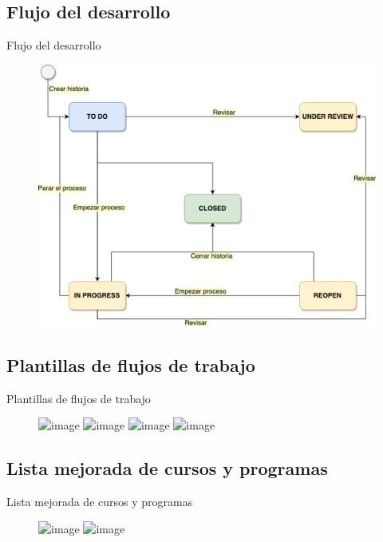 \documentclass[10pt,xcolor=table ]{beamer}
\begin{document}
\subsection{Flujo del desarrollo}
\begin{frame}{Flujo del desarrollo}
\begin{figure}
		\centering
	    \includegraphics[scale=0.35]{../Figuras/workflow_1}
	\end{figure}
\end{frame}

\subsection{Plantillas de flujos de trabajo}
\begin{frame}{Plantillas de flujos de trabajo}
	\begin{figure}
		\centering
		\includegraphics<1>[scale=0.4]{../Figuras/Pantallas/template_1}
		\includegraphics<2>[scale=0.3]{../Figuras/Pantallas/template_2}
		\includegraphics<3>[scale=0.3]{../Figuras/Pantallas/template_3}
		\includegraphics<4>[scale=0.3]{../Figuras/Pantallas/template_4}
	\end{figure}
\end{frame}

\subsection{Lista mejorada de cursos y programas}
\begin{frame}{Lista mejorada de cursos y programas}
	\begin{figure}
		\centering
		\includegraphics<1>[scale=0.3]{../Figuras/Pantallas/curriculum_list_1}
		\includegraphics<2>[scale=0.3]{../Figuras/Pantallas/curriculum_list_2}
	\end{figure}
\end{frame}
\end{document}
